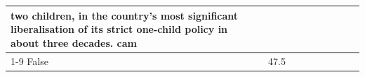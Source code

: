 \begin{table}[H]
\begin{tabular}{lllrlllll}
two children, in the country's most significant liberalisation of its strict one-child policy in about three decades. cam \\
\cline{1-9}
False & 47.5%
\end{tabular}
\end{table}
